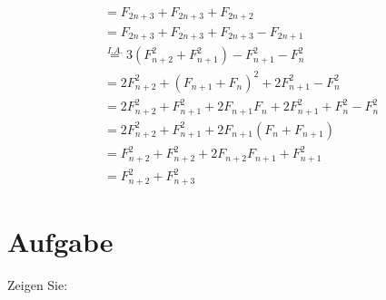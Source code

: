 \documentclass{article}
\begin{document}
\begin{enumerate}[(a)]
{\begin{align*}
			&= F_{2n+3} + F_{2n+3} + F_{2n+2}\\
			&= F_{2n+3} + F_{2n+3} + F_{2n+3} - F_{2n+1}\\
			&\overset{I.A.}{=} 3(F_{n+2}^2 + F_{n+1}^2) - F_{n+1}^2-F_n^2\\
			&=2F_{n+2}^2 + (F_{n+1} +F_n)^2 + 2F_{n+1}^2 - F_n^2\\
			&=2F_{n+2}^2 + F_{n+1}^2 + 2F_{n+1}F_{n} + 2 F_{n+1}^2 + F_{n}^2 - F_n^2\\
			&=2F_{n+2}^2 + F_{n+1}^2 + 2F_{n+1}(F_{n} + F_{n+1})\\
			&=F_{n+2}^2 + F_{n+2}^2 + 2F_{n+2}F_{n+1} + F_{n+1}^2\\
			&=F_{n+2}^2 + F_{n+3}^2
		\end{align*}}
	\end{enumerate}
	\section{Aufgabe}
	Zeigen Sie:
\end{document}

